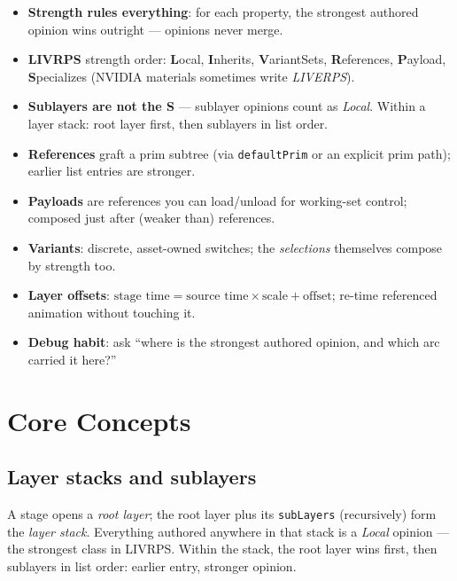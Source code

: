 \CheatSheetTitle
\begin{itemize}[leftmargin=*]
  \item \textbf{Strength rules everything}: for each property, the strongest authored opinion wins outright --- opinions never merge.
  \item \textbf{LIVRPS} strength order: \textbf{L}ocal, \textbf{I}nherits, \textbf{V}ariantSets, \textbf{R}eferences, \textbf{P}ayload, \textbf{S}pecializes (NVIDIA materials sometimes write \emph{LIVERPS}).
  \item \textbf{Sublayers are not the S} --- sublayer opinions count as \emph{Local}. Within a layer stack: root layer first, then sublayers in list order.
  \item \textbf{References} graft a prim subtree (via \texttt{defaultPrim} or an explicit prim path); earlier list entries are stronger.
  \item \textbf{Payloads} are references you can load/unload for working-set control; composed just after (weaker than) references.
  \item \textbf{Variants}: discrete, asset-owned switches; the \emph{selections} themselves compose by strength too.
  \item \textbf{Layer offsets}: $\text{stage time} = \text{source time} \times \text{scale} + \text{offset}$; re-time referenced animation without touching it.
  \item \textbf{Debug habit}: ask ``where is the strongest authored opinion, and which arc carried it here?''
\end{itemize}

\section{Core Concepts}

\subsection{Layer stacks and sublayers}\label{sec:c-stacks}
A stage opens a \emph{root layer}; the root layer plus its
\texttt{subLayers} (recursively) form the \emph{layer stack}. Everything
authored anywhere in that stack is a \emph{Local} opinion --- the strongest
class in LIVRPS. Within the stack, the root layer wins first, then sublayers
in list order: earlier entry, stronger opinion.

